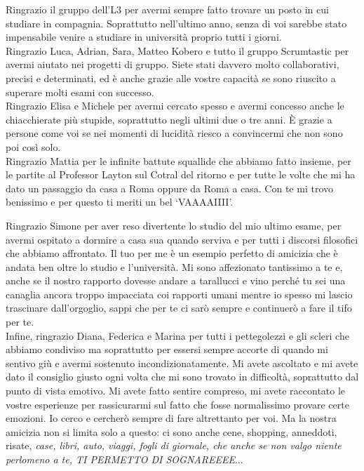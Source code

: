 \documentclass[10pt, oneside]{book}
\begin{document}
\noindent Ringrazio il gruppo dell'L3 per avermi sempre fatto trovare un posto in cui studiare in compagnia. Soprattutto nell'ultimo anno, senza di voi sarebbe stato impensabile venire a studiare in università proprio tutti i giorni.\\

\noindent Ringrazio Luca, Adrian, Sara, Matteo Kobero e tutto il gruppo Scrumtastic per avermi aiutato nei progetti di gruppo. Siete stati davvero molto collaborativi, precisi e determinati, ed è anche grazie alle vostre capacità se sono riuscito a superare molti esami con successo.\\

\noindent Ringrazio Elisa e Michele per avermi cercato spesso e avermi concesso anche le chiacchierate più stupide, soprattutto negli ultimi due o tre anni. È grazie a persone come voi se nei momenti di lucidità riesco a convincermi che non sono poi così solo.\\

\noindent Ringrazio Mattia per le infinite battute squallide che abbiamo fatto insieme, per le partite al Professor Layton sul Cotral del ritorno e per tutte le volte che mi ha dato un passaggio da casa a Roma oppure da Roma a casa. Con te mi trovo benissimo e per questo ti meriti un bel `VAAAAIIII'.

\noindent Ringrazio Simone per aver reso divertente lo studio del mio ultimo esame, per avermi ospitato a dormire a casa sua quando serviva e per tutti i discorsi filosofici che abbiamo affrontato. Il tuo per me è un esempio perfetto di amicizia che è andata ben oltre lo studio e l'università. Mi sono affezionato tantissimo a te e, anche se il nostro rapporto dovesse andare a tarallucci e vino perché tu sei una canaglia ancora troppo impacciata coi rapporti umani mentre io spesso mi lascio trascinare dall'orgoglio, sappi che per te ci sarò sempre e continuerò a fare il tifo per te.\\

\noindent Infine, ringrazio Diana, Federica e Marina per tutti i pettegolezzi e gli scleri che abbiamo condiviso ma soprattutto per essersi sempre accorte di quando mi sentivo giù e avermi sostenuto incondizionatamente. Mi avete ascoltato e mi avete dato il consiglio giusto ogni volta che mi sono trovato in difficoltà, soprattutto dal punto di vista emotivo. Mi avete fatto sentire compreso, mi avete raccontato le vostre esperienze per rassicurarmi sul fatto che fosse normalissimo provare certe emozioni. Io cerco e cercherò sempre di fare altrettanto per voi. Ma la nostra amicizia non si limita solo a questo: ci sono anche cene, shopping, anneddoti, risate, \textit{case, libri, auto, viaggi, fogli di giornale, che anche se non valgo niente perlomeno a te, TI PERMETTO DI SOGNAREEEE}...\\
\end{document}
